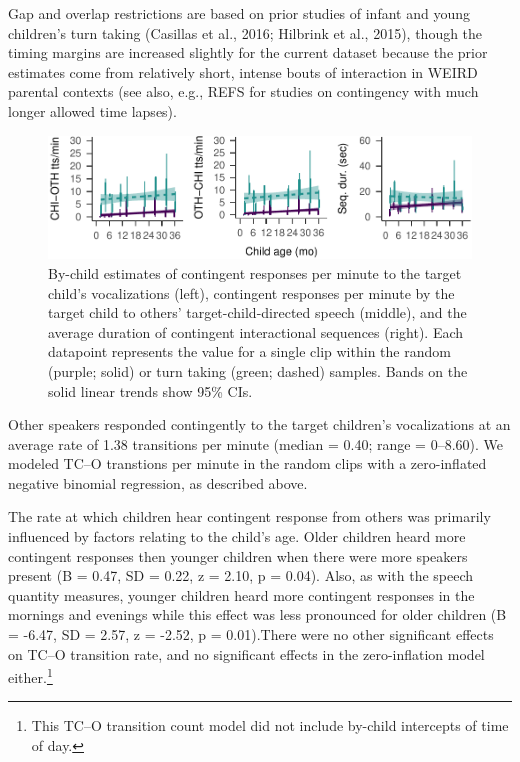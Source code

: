 \documentclass[floatsintext,man]{apa6}
\theoremstyle{definition}
\theoremstyle{definition}
\theoremstyle{definition}
\theoremstyle{remark}
\begin{document}
Gap and overlap restrictions are based on prior studies of infant and
young children's turn taking (Casillas et al., 2016; Hilbrink et al.,
2015), though the timing margins are increased slightly for the current
dataset because the prior estimates come from relatively short, intense
bouts of interaction in WEIRD parental contexts (see also, e.g., REFS
for studies on contingency with much longer allowed time lapses).

\begin{figure}
\centering
\includegraphics{Tseltal-CLE_files/figure-latex/fig6-1.pdf}
\caption{\label{fig:fig6}By-child estimates of contingent responses per
minute to the target child's vocalizations (left), contingent responses
per minute by the target child to others' target-child-directed speech
(middle), and the average duration of contingent interactional sequences
(right). Each datapoint represents the value for a single clip within
the random (purple; solid) or turn taking (green; dashed) samples. Bands
on the solid linear trends show 95\% CIs.}
\end{figure}

Other speakers responded contingently to the target children's
vocalizations at an average rate of 1.38 transitions per minute (median
= 0.40; range = 0--8.60). We modeled TC--O transtions per minute in the
random clips with a zero-inflated negative binomial regression, as
described above.

The rate at which children hear contingent response from others was
primarily influenced by factors relating to the child's age. Older
children heard more contingent responses then younger children when
there were more speakers present (B = 0.47, SD = 0.22, z = 2.10, p =
0.04). Also, as with the speech quantity measures, younger children
heard more contingent responses in the mornings and evenings while this
effect was less pronounced for older children (B = -6.47, SD = 2.57, z =
-2.52, p = 0.01).There were no other significant effects on TC--O
transition rate, and no significant effects in the zero-inflation model
either.\footnote{This TC--O transition count model did not include
  by-child intercepts of time of day.}
\end{document}
